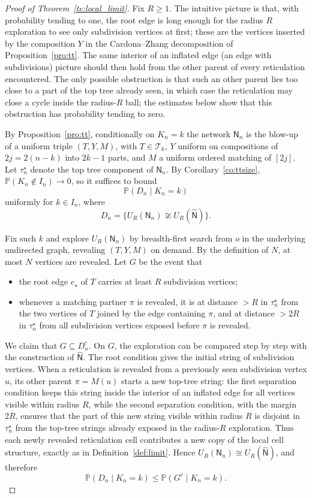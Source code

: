 \documentclass[english,11pt]{smfart}
\newcommand{\Prb}[1]{\mathbb{P}\left(#1\right)}
\newcommand{\cT}{\mathcal{T}}
\newcommand{\mN}{\mathsf{N}}
\numberwithin{equation}{section}
\begin{document}
\begin{proof}[Proof of Theorem~\ref{te:local_limit}]
Fix \(R\ge1\). The intuitive picture is that, with probability tending to one,
the root edge is long enough for the radius \(R\) exploration to see only
subdivision vertices at first; these are the vertices inserted by the
composition \(Y\) in the Cardona--Zhang decomposition of
Proposition~\ref{pro:tt}. The same interior of an inflated edge (an edge with
subdivisions) picture should then hold from the other parent of every
reticulation encountered. The only possible obstruction is that such an other
parent lies too close to a part of the top tree already seen, in which case the
reticulation may close a cycle inside the radius-\(R\) ball; the estimates
below show that this obstruction has probability tending to zero.

\smallskip
By Proposition~\ref{pro:tt}, conditionally on \(K_n=k\) the network \(\mN_n\)
is the blow-up of a uniform triple \((T,Y,M)\), with \(T\in\cT_k\), \(Y\)
uniform on compositions of \(2j=2(n-k)\) into \(2k-1\) parts, and \(M\) a
uniform ordered matching of \([2j]\). Let \(\tau_n^{\star}\) denote the top tree
component of \(\mN_n\). By Corollary~\ref{co:ttsize}, \(\Prb{K_n\notin
I_n}\to0\), so it suffices to bound
\[
  \Prb{D_n\mid K_n=k}
\]
uniformly for \(k\in I_n\), where
\[
  D_n=\{U_R(\mN_n)\not\cong U_R(\hat{\mN})\}.
\]

\smallskip
Fix such \(k\) and explore \(U_R(\mN_n)\) by breadth-first search from \(o\) in
the underlying undirected graph, revealing \((T,Y,M)\) on demand. By the definition of \(N\), at most \(N\) vertices are revealed. Let \(G\) be the event that
\begin{itemize}\itemsep0pt
\item the root edge \(e_\star\) of \(T\) carries at least \(R\) subdivision
  vertices;
\item whenever a matching partner \(\pi\) is revealed, it is at distance \(>R\)
  in \(\tau_n^{\star}\) from the two vertices of \(T\) joined by the edge containing
  \(\pi\), and at distance \(>2R\) in \(\tau_n^{\star}\) from all subdivision vertices
  exposed before \(\pi\) is revealed.
\end{itemize}

\smallskip
We claim that \(G\subseteq D_n^c\). On \(G\), the exploration can be compared
step by step with the construction of \(\hat{\mN}\). The root condition gives
the initial string of subdivision vertices. When a reticulation is revealed
from a previously seen subdivision vertex \(u\), its other parent
\(\pi=M(u)\) starts a new top-tree string: the first separation condition keeps
this string inside the interior of an inflated edge for all vertices visible
within radius \(R\), while the second separation condition, with the margin
\(2R\), ensures that the part of this new string visible within radius \(R\) is
disjoint in \(\tau_n^{\star}\) from the top-tree strings already exposed in the
radius-\(R\) exploration. Thus each newly revealed reticulation cell contributes
a new copy of the local cell structure, exactly as in
Definition~\ref{def:limit}. Hence \(U_R(\mN_n)\cong U_R(\hat{\mN})\), and
therefore
\[
  \Prb{D_n\mid K_n=k}\le \Prb{G^c\mid K_n=k}.
\]


\end{proof}
\end{document}

